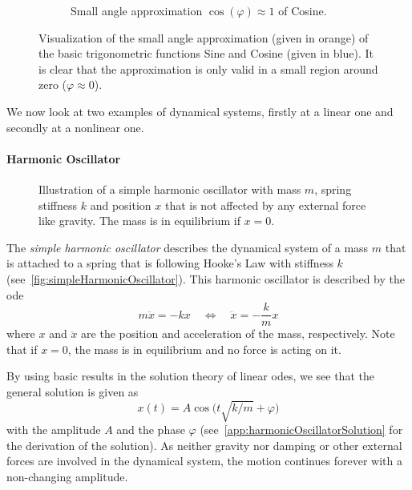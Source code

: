 \begin{figure}
\begin{subfigure}[t]{0.5\linewidth}
			\caption{Small angle approximation \( \cos(\varphi) \approx 1 \) of Cosine.}
		\end{subfigure}
		\caption{Visualization of the small angle approximation (given in orange) of the basic trigonometric functions Sine and Cosine (given in blue). It is clear that the approximation is only valid in a small region around zero (\( \varphi \approx 0 \)).}
		\label{fig:smallAngleApproximation}
	\end{figure}

	We now look at two examples of dynamical systems, firstly at a linear one and secondly at a nonlinear one.

	\paragraph{Harmonic Oscillator}
		\label{subsec:harmonicOscillator}

		\begin{figure}
			\centering
			\tikzHarmonicOscillator
			\caption{Illustration of a simple harmonic oscillator with mass \(m\), spring stiffness \(k\) and position \(x\) that is not affected by any external force like gravity. The mass is in equilibrium if \( x = 0 \).}
			\label{fig:simpleHarmonicOscillator}
		\end{figure}

		The \emph{simple harmonic oscillator} describes the dynamical system of a mass \(m\) that is attached to a spring that is following Hooke's Law with stiffness \(k\) (see~\autoref{fig:simpleHarmonicOscillator}). This harmonic oscillator is described by the \ac{ode}
		\begin{equation}
			m\ddot{x} = -kx \quad\iff\quad \ddot{x} = -\frac{k}{m} x  \label{eq:harmonicOscillator}
		\end{equation}
		where \(x\) and \(\ddot{x}\) are the position and acceleration of the mass, respectively. Note that if \( x = 0 \), the mass is in equilibrium and no force is acting on it.

		By using basic results in the solution theory of linear \acp{ode}, we see that the general solution is given as
		\begin{equation*}
			x(t) = A \cos\Big(t \sqrt{k / m} + \varphi\Big)
		\end{equation*}
		with the amplitude \(A\) and the phase \(\varphi\) (see~\autoref{app:harmonicOscillatorSolution} for the derivation of the solution). As neither gravity nor damping or other external forces are involved in the dynamical system, the motion continues forever with a non-changing amplitude.

